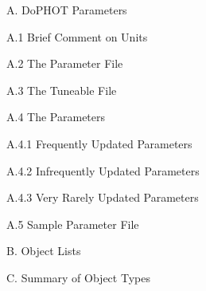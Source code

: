 \item{A.} DoPHOT Parameters
\item\item{A.1} Brief Comment on Units
\item\item{A.2} The Parameter File
\item\item{A.3} The Tuneable File
\item\item{A.4} The Parameters
\item\item{A.4.1} Frequently Updated Parameters
\item\item{A.4.2} Infrequently Updated Parameters
\item\item{A.4.3} Very Rarely Updated Parameters
\item\item{A.5} Sample Parameter File
\item{B.} Object Lists
\item{C.} Summary of Object Types
\vfill
\eject
